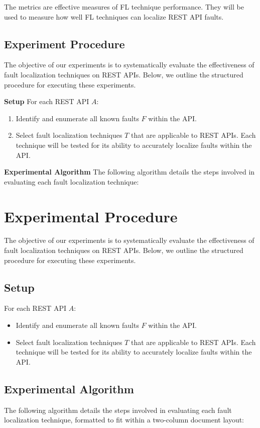 \documentclass[conference]{IEEEtran}
\begin{document}
The metrics are effective measures of FL technique performance. They will be used to measure how well FL techniques can localize REST API faults.

\subsection{Experiment Procedure}
\label{sec:experiment-procedure}

The objective of our experiments is to systematically evaluate the effectiveness of fault localization techniques on REST APIs. Below, we outline the structured procedure for executing these experiments.

\textbf{Setup}
For each REST API \( A \):
\begin{enumerate}
    \item Identify and enumerate all known faults \( F \) within the API.
    \item Select fault localization techniques \( T \) that are applicable to REST APIs. Each technique will be tested for its ability to accurately localize faults within the API.
\end{enumerate}

\textbf{Experimental Algorithm}
The following algorithm details the steps involved in evaluating each fault localization technique:


\section{Experimental Procedure}

The objective of our experiments is to systematically evaluate the effectiveness of fault localization techniques on REST APIs. Below, we outline the structured procedure for executing these experiments.

\subsection{Setup}
For each REST API \( A \):
\begin{itemize}
    \item Identify and enumerate all known faults \( F \) within the API.
    \item Select fault localization techniques \( T \) that are applicable to REST APIs. Each technique will be tested for its ability to accurately localize faults within the API.
\end{itemize}

\subsection{Experimental Algorithm}
The following algorithm details the steps involved in evaluating each fault localization technique, formatted to fit within a two-column document layout:
\end{document}
